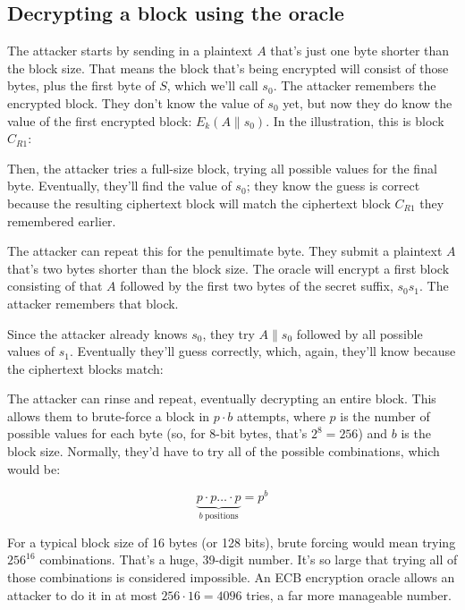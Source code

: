\documentclass[11pt,ebook,table,dvipsnames]{memoir}
\begin{document}
\subsection{Decrypting a block using the oracle}
\label{sec-2-3-2-3}

The attacker starts by sending in a plaintext $A$ that's just one byte
shorter than the block size. That means the block that's being
encrypted will consist of those bytes, plus the first byte of $S$,
which we'll call $s_0$. The attacker remembers the encrypted block.
They don't know the value of $s_0$ yet, but now they do know the value
of the first encrypted block: $E_k(A \| s_0)$. In the illustration,
this is block $C_{R1}$:


Then, the attacker tries a full-size block, trying all possible values
for the final byte. Eventually, they'll find the value of $s_0$; they
know the guess is correct because the resulting ciphertext block will
match the ciphertext block $C_{R1}$ they remembered earlier.


The attacker can repeat this for the penultimate byte. They submit a
plaintext $A$ that's two bytes shorter than the block size. The oracle
will encrypt a first block consisting of that $A$ followed by the
first two bytes of the secret suffix, $s_0s_1$. The attacker remembers
that block.


Since the attacker already knows $s_0$, they try $A \|
s_0$ followed by all possible values of $s_1$. Eventually they'll
guess correctly, which, again, they'll know because the ciphertext
blocks match:


The attacker can rinse and repeat, eventually decrypting an entire
block. This allows them to brute-force a block in $p \cdot b$
attempts, where $p$ is the number of possible values for each byte
(so, for 8-bit bytes, that's $2^8 = 256$) and $b$ is the block size.
Normally, they'd have to try all of the possible combinations, which
would be:

\[
\underbrace{p \cdot p \ldots \cdot p}_{b \ \mathrm{positions}} = p^b
\]

For a typical block size of 16 bytes (or 128 bits), brute forcing
would mean trying $256^{16}$ combinations. That's a huge, 39-digit
number. It's so large that trying all of those combinations is
considered impossible. An ECB encryption oracle allows an attacker to
do it in at most $256 \cdot 16 = 4096$ tries, a far more manageable
number.
\end{document}
